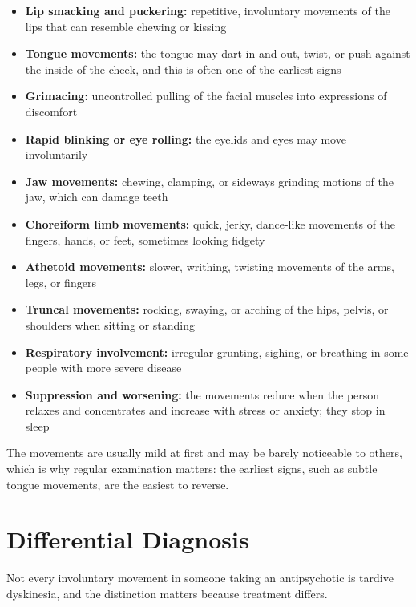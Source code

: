 \begin{itemize}
    \item \textbf{Lip smacking and puckering:} repetitive, involuntary movements of the lips that can resemble chewing or kissing
    \item \textbf{Tongue movements:} the tongue may dart in and out, twist, or push against the inside of the cheek, and this is often one of the earliest signs
    \item \textbf{Grimacing:} uncontrolled pulling of the facial muscles into expressions of discomfort
    \item \textbf{Rapid blinking or eye rolling:} the eyelids and eyes may move involuntarily
    \item \textbf{Jaw movements:} chewing, clamping, or sideways grinding motions of the jaw, which can damage teeth
    \item \textbf{Choreiform limb movements:} quick, jerky, dance-like movements of the fingers, hands, or feet, sometimes looking fidgety
    \item \textbf{Athetoid movements:} slower, writhing, twisting movements of the arms, legs, or fingers
    \item \textbf{Truncal movements:} rocking, swaying, or arching of the hips, pelvis, or shoulders when sitting or standing
    \item \textbf{Respiratory involvement:} irregular grunting, sighing, or breathing in some people with more severe disease
    \item \textbf{Suppression and worsening:} the movements reduce when the person relaxes and concentrates and increase with stress or anxiety; they stop in sleep
\end{itemize}

The movements are usually mild at first and may be barely noticeable to others, which is why regular examination matters: the earliest signs, such as subtle tongue movements, are the easiest to reverse.

\section*{Differential Diagnosis}
Not every involuntary movement in someone taking an antipsychotic is tardive dyskinesia, and the distinction matters because treatment differs.

